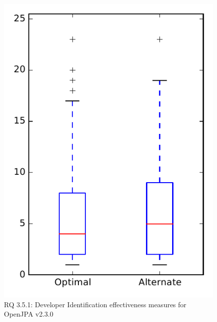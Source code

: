 
\begin{figure}
\centering
\includegraphics[height=0.4\textheight]{figures/combo/dit_rq1_openjpa}
\caption{RQ 3.5.1: Developer Identification effectiveness measures for OpenJPA v2.3.0}
\label{fig:dit:rq1:openjpa}
\end{figure}
